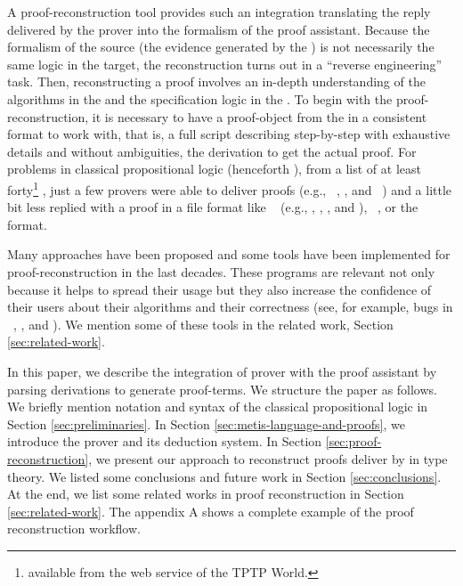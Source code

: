 \documentclass[../main.tex]{subfiles}
\begin{document}
A proof-reconstruction tool provides such an integration translating
the reply delivered by the prover into the formalism of the proof
assistant. Because the formalism of the source (the evidence
generated by the \ATP) is not necessarily the same logic in the
target, the reconstruction turns out in a ``reverse engineering''
task. Then, reconstructing a proof involves an in-depth
understanding of the algorithms in the \ATP and the specification
logic in the \ITP. To begin with the proof-reconstruction, it is
necessary to have a proof-object from the \ATP in a consistent
format to work with, that is, a full script describing step-by-step
with exhaustive details and without ambiguities, the derivation to
get the actual proof.
For problems in classical propositional logic (henceforth \CPL),
from a list of at least forty\footnote{\ATPs available from the web
service  of the TPTP World.} \ATPs, just a few
provers were able to deliver proofs (e.g.,
~\cite{Barrett2011}, , and
~\cite{hillenbrand1997}) and a little bit less replied with a proof
in a file format like \TSTP~\cite{Sutcliffe-Schulz-Claessen-VanGelder-2006} (e.g.,
, \Metis, , and ),
~\cite{Stump2008}, or the ~\cite{Bohme2011} format.

Many approaches have been proposed and some tools have been
implemented for proof-reconstruction in the last decades. These
programs are relevant not only because it helps to spread their
usage but they also increase the confidence of their users about
their algorithms and their correctness (see, for example, bugs in
\ATPs~\cite{Keller2013}, \cite{Bohme2011}, \cite{Fleury2014} and
\cite{Kanso2012}). We mention some of these tools in the related
work, Section \ref{sec:related-work}.

In this paper, we describe the integration of \Metis prover with the
proof assistant \Agda by parsing \TSTP derivations to generate \Agda
proof-terms. We structure the paper as follows.
We briefly mention notation and syntax of the classical propositional
logic in Section \ref{sec:preliminaries}.
In Section \ref{sec:metis-language-and-proofs}, we introduce the
\Metis prover and its deduction system.
In Section \ref{sec:proof-reconstruction}, we present our
approach to reconstruct proofs deliver by \Metis in type theory.
We listed some conclusions and future work in Section
\ref{sec:conclusions}. At the end, we list some related works in
proof reconstruction in Section \ref{sec:related-work}.
The appendix \textsc{A} shows a complete example of the proof
reconstruction workflow.
\end{document}
